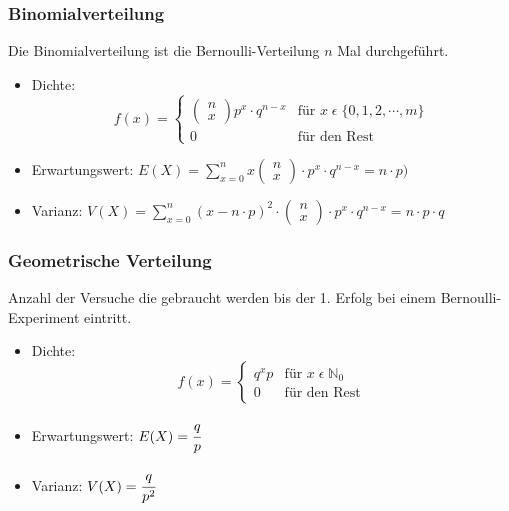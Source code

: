 \documentclass[a4paper]{scrartcl}
\begin{document}
            \subsubsection{Binomialverteilung}
                Die Binomialverteilung ist die Bernoulli-Verteilung \(n\) Mal durchgeführt.
                \begin{itemize}
                    \item Dichte: \[f(x)=
                                                        \begin{cases}
                                                            \begin{pmatrix} n \\ x \end{pmatrix} p^x \cdot q^{n - x} & \text{für } x \; \epsilon \; \{0,1,2,\cdots, m\} \\
                                                            0     & \text{für den Rest} 
                                                        \end{cases}
                                                        \] 
                    \item Erwartungswert: \(E(X) = \sum\limits_{x =0}^n x \begin{pmatrix} n \\ x \end{pmatrix} \cdot p^x \cdot q^{n - x} = n \cdot p ) \)
                    \item Varianz: \(V(X) = \sum\limits_{x=0}^n (x - n \cdot p)^2 \cdot \begin{pmatrix} n \\ x \end{pmatrix} \cdot p^x \cdot q^{n - x} = n \cdot p \cdot q\) 
                \end{itemize}
            \subsubsection{Geometrische Verteilung}
            Anzahl der Versuche die gebraucht werden bis der 1. Erfolg bei einem Bernoulli-Experiment eintritt. 
            \begin{itemize}
                \item Dichte: \[f(x)=
                                                    \begin{cases}
                                                        q^xp     & \text{für } x \; \epsilon \; \mathbb{N}_0 \\
                                                        0     & \text{für den Rest} 
                                                    \end{cases}
                                                    \] 
                \item Erwartungswert: \(E(X) = \cfrac{q}{p}\)
                \item Varianz: \(V(X) = \cfrac{q}{p^2}\) 
            \end{itemize}
\end{document}

